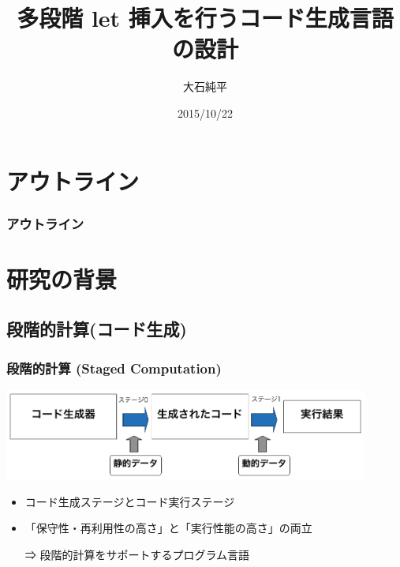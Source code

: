 \documentclass[dvipdfmx,cjk,xcolor=dvipsnames,envcountsect,notheorems,12pt]{beamer}
\title{多段階 let 挿入を行うコード生成言語の設計}
\author{大石純平}
\institute[筑波大学 プログラム論理研究室]{筑波大学 大学院 \\ プログラム論理研究室}%
\date{2015/10/22}
\theoremstyle{definition}
\begin{document}
\frame[plain]{\titlepage}%

\section*{アウトライン}

\begin{frame}
  \frametitle{アウトライン}
  \tableofcontents[sectionstyle=show,subsectionstyle=hide]
\end{frame}

\section{研究の背景}

\subsection{段階的計算(コード生成)}

\begin{frame}
  \frametitle{段階的計算 (Staged Computation)}
  \includegraphics[clip,width=12cm]{./img/prggen.png}

  \begin{itemize}
  \item コード生成ステージとコード実行ステージ
  \item 「保守性・再利用性の高さ」と「実行性能の高さ」の両立
  \item[⇒] 段階的計算をサポートするプログラム言語
  \end{itemize}
\end{frame}

\end{document}
